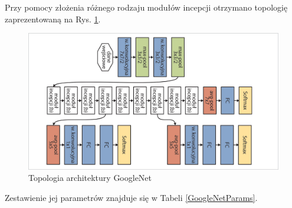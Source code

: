 Przy pomocy złożenia różnego rodzaju modułów incepcji otrzymano topologię zaprezentowaną na Rys. \ref{GoogleNetTopo}.
\begin{figure}[h!]
	\centering
	\includegraphics[width=1\textwidth]{figures/GoogleNet.jpg}
	\caption{Topologia architektury GoogleNet}
	\label{GoogleNetTopo}
\end{figure}
Zestawienie jej parametrów znajduje się w Tabeli \ref{GoogleNetParams}.
\renewcommand{\arraystretch}{1.2}
